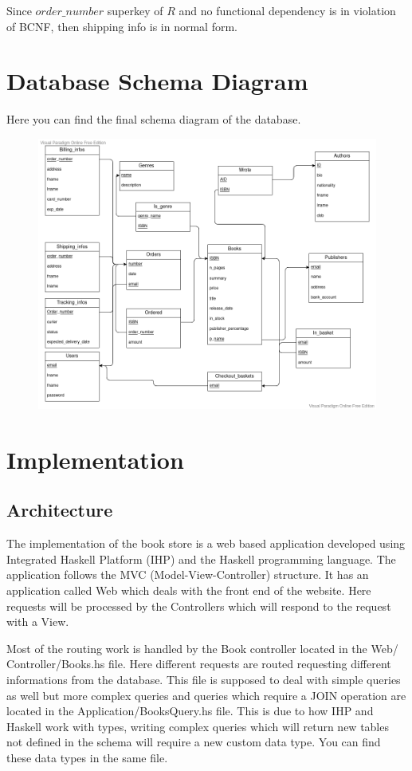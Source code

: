 \documentclass[fleqn]{scrreprt}
\begin{document}
Since $order\_number$ superkey of $R$ and no functional dependency is in violation
of BCNF, then shipping info is in normal form.

\chapter{Database Schema Diagram}
Here you can find the final schema diagram of the database.
\begin{figure}[h]\centering
    \includegraphics[width=\columnwidth]{database-schema-diagram.vpd.png}
    \label{fig:dsd}
\end{figure}

\chapter{Implementation}
\section{Architecture}
The implementation of the book store is a web based application developed using
Integrated Haskell Platform (IHP) and the Haskell programming language. The
application follows the MVC (Model-View-Controller) structure. It has an application
called Web which deals with the front end of the website. Here requests will be
processed by the Controllers which will respond to the request with a View.

Most of the routing work is handled by the Book controller located in the
Web/ Controller/Books.hs file. Here different requests are routed requesting
different informations from the database.
This file is supposed to deal with simple queries as well but
more complex queries and queries which require a JOIN operation are located
in the Application/BooksQuery.hs file. This is due to how IHP and Haskell work
with types, writing complex queries which will return new tables not defined
in the schema will require a new custom data type. You can find these data types
in the same file.
\end{document}
